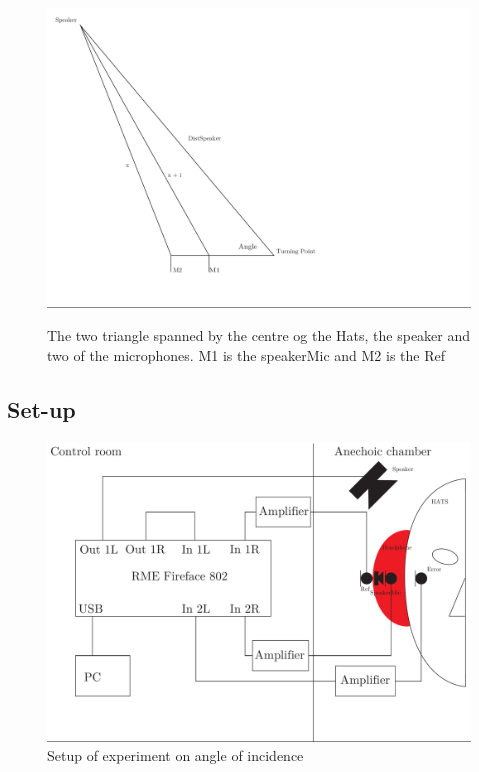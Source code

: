 \begin{figure}[H]
	\includegraphics[width=\textwidth]{../Journal/Experiments/AngleOfIncidence/TriangleCalculation.pdf}
	\label{Fig:AngleOfIcidenceTriangleCalculation}
	\caption{The two triangle spanned by the centre og the Hats, the speaker and two of the microphones. M1 is the speakerMic and M2 is the Ref}
\end{figure}  


\subsection{Set-up}
\begin{figure}[H]
	\includegraphics[width=\textwidth]{../Journal/Experiments/AngleOfIncidence/AngleOfIncidenceSetup.pdf}
	\caption{Setup of experiment on angle of incidence}
	\label{Fig:AngleOfIncidenceSetup}
\end{figure}

